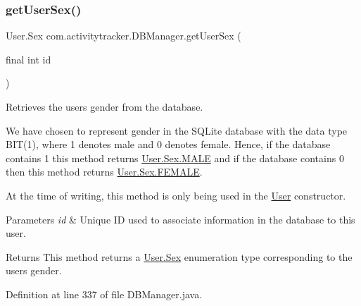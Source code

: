 \subsubsection{\texorpdfstring{get\+User\+Sex()}{getUserSex()}}
{\footnotesize\ttfamily User.\+Sex com.\+activitytracker.\+D\+B\+Manager.\+get\+User\+Sex (\begin{DoxyParamCaption}\item[{final int}]{id }\end{DoxyParamCaption})}

Retrieves the user\textquotesingle{}s gender from the database.

We have chosen to represent gender in the S\+Q\+Lite database with the data type B\+IT(1), where 1 denotes male and 0 denotes female. Hence, if the database contains 1 this method returns \mbox{\hyperlink{enumcom_1_1activitytracker_1_1_user_1_1_sex_ad3b626a38bd4615eb621d75b939f412d}{User.\+Sex.\+M\+A\+LE}} and if the database contains 0 then this method returns \mbox{\hyperlink{enumcom_1_1activitytracker_1_1_user_1_1_sex_a5c22ece8a4df71ed5202cd492990a752}{User.\+Sex.\+F\+E\+M\+A\+LE}}.

At the time of writing, this method is only being used in the \mbox{\hyperlink{classcom_1_1activitytracker_1_1_user}{User}} constructor.


\begin{DoxyParams}{Parameters}
{\em id} & Unique ID used to associate information in the database to this user.\\
\hline
\end{DoxyParams}
\begin{DoxyReturn}{Returns}
This method returns a \mbox{\hyperlink{enumcom_1_1activitytracker_1_1_user_1_1_sex}{User.\+Sex}} enumeration type corresponding to the user\textquotesingle{}s gender. 
\end{DoxyReturn}


Definition at line 337 of file D\+B\+Manager.\+java.


